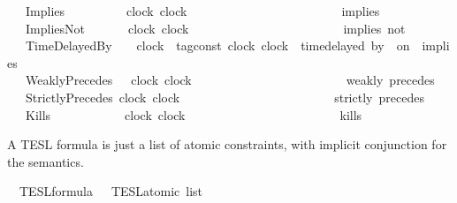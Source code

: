 \begin{isabellebody}
\ \ {\isacharbar}\ Implies\ \ \ \ \ \ \ \ \ \ {\isacartoucheopen}clock{\isacartoucheclose}\ {\isacartoucheopen}clock{\isacartoucheclose}\ \ \ \ \ \ \ \ \ \ \ \ \ \ \ \ \ \ \ \ \ \ \ \ {\isacharparenleft}\ {\isachardoublequoteopen}implies{\isachardoublequoteclose}\ {}{}{\isacharparenright}\isanewline
\ \ {\isacharbar}\ ImpliesNot\ \ \ \ \ \ \ {\isacartoucheopen}clock{\isacartoucheclose}\ {\isacartoucheopen}clock{\isacartoucheclose}\ \ \ \ \ \ \ \ \ \ \ \ \ \ \ \ \ \ \ \ \ \ \ \ {\isacharparenleft}\ {\isachardoublequoteopen}implies\ not{\isachardoublequoteclose}\ {}{}{\isacharparenright}\isanewline
\ \ {\isacharbar}\ TimeDelayedBy\ \ \ \ {\isacartoucheopen}clock{\isacartoucheclose}\ {\isacartoucheopen}{\isacharprime}{\isasymtau}\ tag{\isacharunderscore}const{\isacartoucheclose}\ {\isacartoucheopen}clock{\isacartoucheclose}\ {\isacartoucheopen}clock{\isacartoucheclose}\ {\isacharparenleft}{\isachardoublequoteopen}{\isacharunderscore}\ time{\isacharminus}delayed\ by\ {\isacharunderscore}\ on\ {\isacharunderscore}\ implies\ {\isacharunderscore}{\isachardoublequoteclose}\ {}{}{\isacharparenright}\isanewline
\ \ {\isacharbar}\ WeaklyPrecedes\ \ \ {\isacartoucheopen}clock{\isacartoucheclose}\ {\isacartoucheopen}clock{\isacartoucheclose}\ \ \ \ \ \ \ \ \ \ \ \ \ \ \ \ \ \ \ \ \ \ \ \ {\isacharparenleft}\ {\isachardoublequoteopen}weakly\ precedes{\isachardoublequoteclose}\ {}{}{\isacharparenright}\isanewline
\ \ {\isacharbar}\ StrictlyPrecedes\ {\isacartoucheopen}clock{\isacartoucheclose}\ {\isacartoucheopen}clock{\isacartoucheclose}\ \ \ \ \ \ \ \ \ \ \ \ \ \ \ \ \ \ \ \ \ \ \ \ {\isacharparenleft}\ {\isachardoublequoteopen}strictly\ precedes{\isachardoublequoteclose}\ {}{}{\isacharparenright}\isanewline
\ \ {\isacharbar}\ Kills\ \ \ \ \ \ \ \ \ \ \ \ {\isacartoucheopen}clock{\isacartoucheclose}\ {\isacartoucheopen}clock{\isacartoucheclose}\ \ \ \ \ \ \ \ \ \ \ \ \ \ \ \ \ \ \ \ \ \ \ \ {\isacharparenleft}\ {\isachardoublequoteopen}kills{\isachardoublequoteclose}\ {}{}{\isacharparenright}%
\begin{isamarkuptext}%
A TESL formula is just a list of atomic constraints, with implicit conjunction for the semantics.%
\end{isamarkuptext}\isamarkuptrue%
\isamarkupfalse%
\ {\isacharprime}{\isasymtau}\ TESL{\isacharunderscore}formula\ {\isacharequal}\ {\isacartoucheopen}{\isacharprime}{\isasymtau}\ TESL{\isacharunderscore}atomic\ list{\isacartoucheclose}%

\end{isabellebody}

